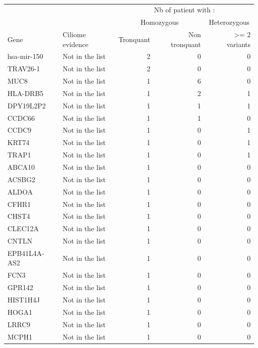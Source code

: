 \documentclass[12pt,twoside]{reedthesis}
\theoremstyle{definition}
\theoremstyle{definition}
\theoremstyle{remark}
\begin{document}
  \newpage
  
  \begin{longtable}[t]{llrrr}
  \caption{\label{tab:annexetabaftergrp3}}\\
  \toprule
  \multicolumn{1}{c}{ } & \multicolumn{1}{c}{ } & \multicolumn{3}{c}{Nb of patient with : } \\
  \cmidrule(l{2pt}r{2pt}){3-5}
  \multicolumn{1}{c}{ } & \multicolumn{1}{c}{ } & \multicolumn{2}{c}{Homozygous} & \multicolumn{1}{c}{Heterozygous} \\
  \cmidrule(l{2pt}r{2pt}){3-4} \cmidrule(l{2pt}r{2pt}){5-5}
  Gene & Ciliome evidence & Tronquant & Non tronquant & >= 2 variants\\
  \midrule
  hsa-mir-150 & Not in the list & 2 & 0 & 0\\
  TRAV26-1 & Not in the list & 2 & 0 & 0\\
  MUC8 & Not in the list & 1 & 6 & 0\\
  HLA-DRB5 & Not in the list & 1 & 2 & 1\\
  DPY19L2P2 & Not in the list & 1 & 1 & 1\\
  \addlinespace
  CCDC66 & Not in the list & 1 & 1 & 0\\
  CCDC9 & Not in the list & 1 & 0 & 1\\
  KRT74 & Not in the list & 1 & 0 & 1\\
  TRAP1 & Not in the list & 1 & 0 & 1\\
  ABCA10 & Not in the list & 1 & 0 & 0\\
  \addlinespace
  ACSBG2 & Not in the list & 1 & 0 & 0\\
  ALDOA & Not in the list & 1 & 0 & 0\\
  CFHR1 & Not in the list & 1 & 0 & 0\\
  CHST4 & Not in the list & 1 & 0 & 0\\
  CLEC12A & Not in the list & 1 & 0 & 0\\
  \addlinespace
  CNTLN & Not in the list & 1 & 0 & 0\\
  EPB41L4A-AS2 & Not in the list & 1 & 0 & 0\\
  FCN3 & Not in the list & 1 & 0 & 0\\
  GPR142 & Not in the list & 1 & 0 & 0\\
  HIST1H4J & Not in the list & 1 & 0 & 0\\
  \addlinespace
  HOGA1 & Not in the list & 1 & 0 & 0\\
  LRRC9 & Not in the list & 1 & 0 & 0\\
  MCPH1 & Not in the list & 1 & 0 & 0\\

\end{longtable}
\end{document}
